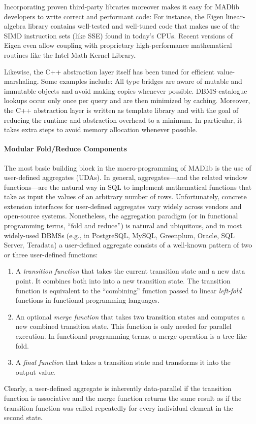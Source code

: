 Incorporating proven third-party libraries moreover makes it easy for MADlib developers to write correct and performant code: For instance, the Eigen linear-algebra library contains well-tested and well-tuned code that makes use of the SIMD instruction sets (like SSE) found in today's CPUs. Recent versions of Eigen even allow coupling with proprietary high-performance mathematical routines like the Intel Math Kernel Library.

Likewise, the C++ abstraction layer itself has been tuned for efficient value-marshaling. Some examples include: All type bridges are aware of mutable and immutable objects and avoid making copies whenever possible. DBMS-catalogue lookups occur only once per query and are then minimized by caching. Moreover, the C++ abstraction layer is written as template library and with the goal of reducing the runtime and abstraction overhead to a minimum. In particular, it takes extra steps to avoid memory allocation whenever possible.

\paragraph{Modular Fold/Reduce Components}

The most basic building block in the macro-programming of MADlib is the use of user-defined aggregates (UDAs). In general, aggregates---and the related window functions---are the natural way in SQL to implement mathematical functions that take as input the values of an arbitrary number of rows. Unfortunately, concrete extension interfaces for user-defined aggregates vary widely across vendors and open-source systems. Nonetheless, the aggregation paradigm (or in functional programming terms, ``fold and reduce'') is natural and ubiquitous, and in most widely-used DBMSs (e.g., in PostgreSQL, MySQL, Greenplum, Oracle, SQL Server, Teradata) a user-defined aggregate consists of a well-known pattern of two or three user-defined functions:
\begin{enumerate}
	\item A \emph{transition function} that takes the current transition state and a new data point. It combines both into into a new transition state. The transition function is equivalent to the ``combining'' function passed to linear \emph{left-fold} functions in functional-programming languages.
	\item An optional \emph{merge function} that takes two transition states and computes a new combined transition state. This function is only needed for parallel execution. In functional-programming terms, a merge operation is a tree-like fold.
	\item A \emph{final function} that takes a transition state and transforms it into the output value.
\end{enumerate}
Clearly, a user-defined aggregate is inherently data-parallel if the transition function is associative and the merge function returns the same result as if the transition function was called repeatedly for every individual element in the second state.

